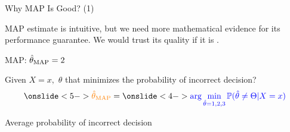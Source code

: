 



\begin{frame}{Why MAP Is Good? (1)}

\plitemsep 0.1in
\bci
\item<1-> MAP estimate is intuitive, but we need more mathematical
  evidence for its performance guarantee. We would trust its quality
  if it is . 

  {
    \bci
\item<3-> MAP: $\hat{\theta}_{\text{MAP}} = 2$
    \eci
  }
  {
    \small
    \plitemsep 0.1in
    \bci
  \item<4-> Given $X=x,$ $\theta$ that minimizes the probability of
    incorrect decision?
    $$
    \onslide<5->{\orangef{\hth_\map}} = \onslide<4->{\bluef{\arg \min_{\hat{\theta} = 1, 2, 3} \cprob{\hth \neq \Theta| X=x}}}
    $$

    \vspace{-0.6cm}
  \item<6-> Average probability of incorrect decision
    
    \eci
  }

  \eci

\end{frame}

